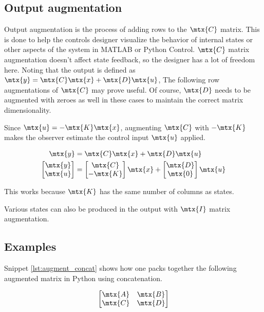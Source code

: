 \subsection{Output augmentation}

Output augmentation is the process of adding rows to the $\mtx{C}$ matrix. This
is done to help the controls designer visualize the behavior of internal states
or other aspects of the \gls{system} in MATLAB or Python Control. $\mtx{C}$
matrix augmentation doesn't affect \gls{state} feedback, so the designer has a
lot of freedom here. Noting that the \gls{output} is defined as
$\mtx{y} = \mtx{C}\mtx{x} + \mtx{D}\mtx{u}$, The following row augmentations of
$\mtx{C}$ may prove useful. Of course, $\mtx{D}$ needs to be augmented with
zeroes as well in these cases to maintain the correct matrix dimensionality.

Since $\mtx{u} = -\mtx{K}\mtx{x}$, augmenting $\mtx{C}$ with $-\mtx{K}$ makes
the \gls{observer} estimate the \gls{control input} $\mtx{u}$ applied.

\begin{align*}
  \mtx{y} &= \mtx{C}\mtx{x} + \mtx{D}\mtx{u} \\
  \begin{bmatrix}
    \mtx{y} \\
    \mtx{u}
  \end{bmatrix} &=
  \begin{bmatrix}
    \mtx{C} \\
    -\mtx{K}
  \end{bmatrix}
  \mtx{x} +
  \begin{bmatrix}
    \mtx{D} \\
    \mtx{0}
  \end{bmatrix}
  \mtx{u}
\end{align*}

This works because $\mtx{K}$ has the same number of columns as \glspl{state}.

Various \glspl{state} can also be produced in the \gls{output} with $\mtx{I}$
matrix augmentation.

\subsection{Examples}

Snippet \ref{lst:augment_concat} shows how one packs together the following
augmented matrix in Python using concatenation.

\begin{equation*}
  \begin{bmatrix}
    \mtx{A} & \mtx{B} \\
    \mtx{C} & \mtx{D}
  \end{bmatrix}
\end{equation*}

